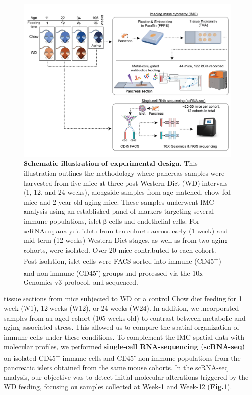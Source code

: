 \begin{figure}[H]
\centering
\includegraphics[width=15cm]{Chapter4/Fig/F2-1-01.png}
\caption[Experimental Design]{\textbf{Schematic illustration of experimental design.} This illustration outlines the methodology where pancreas samples were harvested from five mice at three post-Western Diet (WD) intervals (1, 12, and 24 weeks), alongside samples from age-matched, chow-fed mice and 2-year-old aging mice. These samples underwent IMC analysis using an established panel of markers targeting several immune populations, islet β-cells and endothelial cells. For scRNAseq analysis islets from ten cohorts across early (1 week) and mid-term (12 weeks) Western Diet stages, as well as from two aging cohorts, were isolated. Over 20 mice contributed to each cohort. Post-isolation, islet cells were FACS-sorted into immune (CD45\textsuperscript{+}) and non-immune (CD45\textsuperscript{-}) groups and processed via the 10x Genomics v3 protocol, and sequenced.}
\label{fig:wdaging_experimental_design}
\end{figure}

 tissue sections from mice subjected to WD or a control Chow diet feeding for 1 week (W1), 12 weeks (W12), or 24 weeks (W24). In addition, we incorporated samples from an aged cohort (105 weeks old) to contrast between metabolic and aging-associated stress. This allowed us to compare the spatial organization of immune cells under these conditions. To complement the IMC spatial data with molecular profiles, we performed \textbf{single-cell RNA-sequencing (scRNA-seq)} on isolated CD45\textsuperscript{+} immune cells and CD45\textsuperscript{-} non-immune populations from the pancreatic islets obtained from the same mouse cohorts. In the scRNA-seq analysis, our objective was to detect initial molecular alterations triggered by the WD feeding, focusing on samples collected at Week-1 and Week-12 (\textbf{Fig.\ref{fig:wdaging_experimental_design}}).





